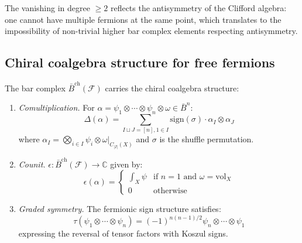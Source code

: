 \begin{remark}
The vanishing in degree $\geq 2$ reflects the antisymmetry of the Clifford algebra: one cannot have multiple fermions at the same point, which translates to the impossibility of non-trivial higher bar complex elements respecting antisymmetry.
\end{remark}

 
\subsection{Chiral coalgebra structure for free fermions}

\begin{theorem}\label{thm:fermion-bar-coalg}
The bar complex $\bar{B}^{\text{ch}}(\mathcal{F})$ carries the chiral coalgebra structure:
\begin{enumerate}
\item \emph{Comultiplication.} For $\alpha = \psi_1 \otimes \cdots \otimes \psi_n \otimes \omega \in \bar{B}^n$:
\[
\Delta(\alpha) = \sum_{I \sqcup J = [n], 1 \in I} \text{sign}(\sigma) \cdot \alpha_I \otimes \alpha_J
\]
where $\alpha_I = \bigotimes_{i \in I} \psi_i \otimes \omega|_{C_{|I|}(X)}$ and $\sigma$ is the shuffle permutation.

\item \emph{Counit.} $\epsilon: \bar{B}^{\text{ch}}(\mathcal{F}) \to \mathbb{C}$ given by:
\[
\epsilon(\alpha) = \begin{cases}
\int_X \psi & \text{if } n = 1 \text{ and } \omega = \text{vol}_X \\
0 & \text{otherwise}
\end{cases}
\]

\item \emph{Graded symmetry.} The fermionic sign structure satisfies:
\[
\tau(\psi_1 \otimes \cdots \otimes \psi_n) = (-1)^{n(n-1)/2} \psi_n \otimes \cdots \otimes \psi_1
\]
expressing the reversal of tensor factors with Koszul signs.
\end{enumerate}
\end{theorem}

